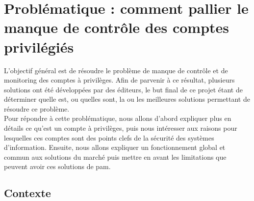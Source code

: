 %
%
%
%
%
%

\section{Problématique : comment pallier le manque de contrôle des comptes privilégiés}

L'objectif général est de résoudre le problème de manque de contrôle et de monitoring des comptes à privilèges. Afin de parvenir à ce résultat, plusieurs solutions ont été développées par des éditeurs, le but final de ce projet étant de déterminer quelle est, ou quelles sont, la ou les meilleures solutions permettant de résoudre ce problème.\\
Pour répondre à cette problématique, nous allons d'abord expliquer plus en détails ce qu'est un compte à privilèges, puis nous intéresser aux raisons pour lesquelles ces comptes sont des points clefs de la sécurité des systèmes d'information. Ensuite, nous allons expliquer un fonctionnement global et commun aux solutions du marché puis mettre en avant les limitations que peuvent avoir ces solutions de \gls{pam}.

\subsection{Contexte}


